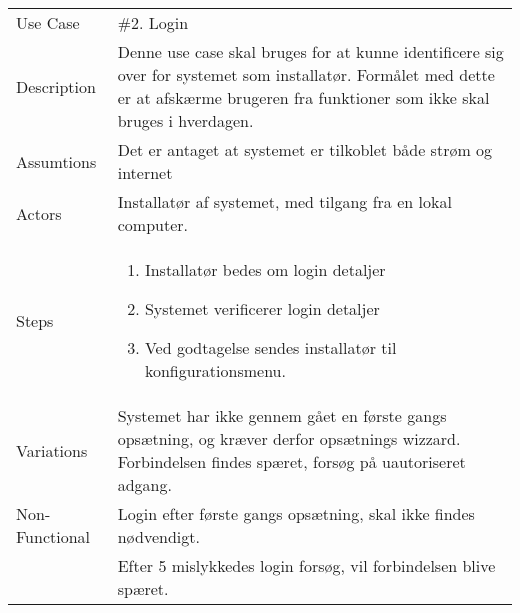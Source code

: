 \noindent
\begin{tabular}{@{}p{3.5cm}@{}p{13cm}@{}}
    Use Case & \#2. Login \\
    Description &  
    Denne use case skal bruges for at kunne identificere sig over for systemet som installatør. Formålet med dette er at afskærme brugeren fra funktioner som ikke skal bruges i hverdagen.\\
    Assumtions &  
    Det er antaget at systemet er tilkoblet både strøm og internet\\
    Actors & 
    Installatør af systemet, med tilgang fra en lokal computer.\\
    Steps & 
    \begin{enumerate}
        \item Installatør bedes om login detaljer
        \item Systemet verificerer login detaljer
        \item Ved godtagelse sendes installatør til konfigurationsmenu.
    \end{enumerate}\\
    Variations & 
    Systemet har ikke gennem gået en første gangs opsætning, og kræver derfor opsætnings wizzard.
    Forbindelsen findes spæret, forsøg på uautoriseret adgang.\\
    Non-Functional &
    Login efter første gangs opsætning, skal ikke findes nødvendigt.\\ &
    Efter 5 mislykkedes login forsøg, vil forbindelsen blive spæret.
\end{tabular}
\\\\

